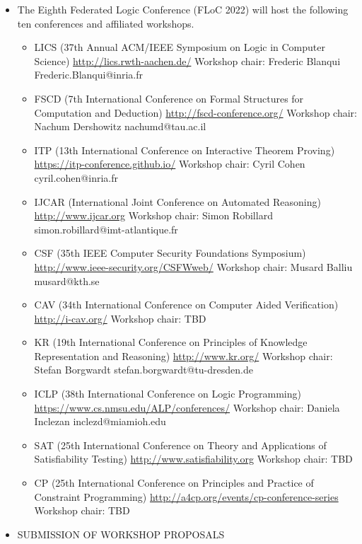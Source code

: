 \documentclass[prodmode,acmtecs]{acmsmall} %
\begin{document}
\begin{itemize}\item  The Eighth Federated Logic Conference (FLoC 2022) will host the following ten conferences and affiliated workshops. 
 
\begin{itemize}\item  LICS (37th Annual ACM/IEEE Symposium on Logic in Computer Science)  \href{http://lics.rwth-aachen.de/}{http://lics.rwth-aachen.de/} Workshop chair: Frederic Blanqui Frederic.Blanqui@inria.fr
\item  FSCD (7th International Conference on Formal Structures for Computation and Deduction)  \href{http://fscd-conference.org/}{http://fscd-conference.org/} Workshop chair: Nachum Dershowitz nachumd@tau.ac.il
\item  ITP (13th International Conference on Interactive Theorem Proving)  \href{https://itp-conference.github.io/}{https://itp-conference.github.io/} Workshop chair: Cyril Cohen cyril.cohen@inria.fr
\item  IJCAR (International Joint Conference on Automated Reasoning) \href{http://www.ijcar.org}{http://www.ijcar.org} Workshop chair: Simon Robillard simon.robillard@imt-atlantique.fr
\item  CSF (35th IEEE Computer Security Foundations Symposium)  \href{http://www.ieee-security.org/CSFWweb/}{http://www.ieee-security.org/CSFWweb/} Workshop chair: Musard Balliu musard@kth.se
\item  CAV (34th International Conference on Computer Aided Verification) \href{http://i-cav.org/}{http://i-cav.org/} Workshop chair: TBD
\item  KR (19th International Conference on Principles of Knowledge Representation and Reasoning) \href{http://www.kr.org/}{http://www.kr.org/} Workshop chair: Stefan Borgwardt stefan.borgwardt@tu-dresden.de
\item  ICLP (38th International Conference on Logic Programming)  \href{https://www.cs.nmsu.edu/ALP/conferences/}{https://www.cs.nmsu.edu/ALP/conferences/} Workshop chair: Daniela Inclezan inclezd@miamioh.edu
\item  SAT (25th International Conference on Theory and Applications of Satisfiability Testing)  \href{http://www.satisfiability.org}{http://www.satisfiability.org} Workshop chair: TBD
\item  CP (25th International Conference on Principles and Practice of Constraint Programming)  \href{http://a4cp.org/events/cp-conference-series}{http://a4cp.org/events/cp-conference-series} Workshop chair: TBD
\end{itemize} 
\item  SUBMISSION OF WORKSHOP PROPOSALS 
 

\end{itemize}
\end{document}
